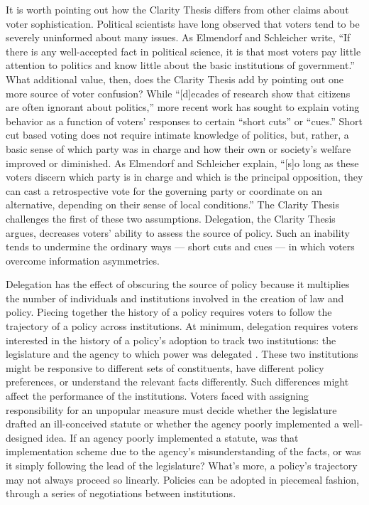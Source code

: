 \documentclass{article}
\begin{document}
It is worth pointing out how the Clarity Thesis differs from other claims about voter sophistication. Political scientists have long observed that voters tend to be severely uninformed about many issues. As Elmendorf and Schleicher write, ``If there is any well-accepted fact in political science, it is that most voters pay little attention to politics and know little about the basic institutions of government.''\citep[p. 1850-51]{Elmendorf2012} What additional value, then, does the Clarity Thesis add by pointing out one more source of voter confusion? While ``[d]ecades of research show that citizens are often ignorant about politics,'' more recent work has sought to explain voting behavior as a function of voters' responses to certain ``short cuts'' or ``cues.''\cite[p. 3]{James2010} Short cut based voting does not require intimate knowledge of politics, but, rather, a basic sense of which party was in charge and how their own or society's welfare improved or diminished.\citep{Lenz2012b} As Elmendorf and Schleicher explain, ``[s]o long as these voters discern which party is in charge and which is the principal opposition, they can cast a retrospective vote for the governing party or coordinate on an alternative, depending on their sense of local conditions.''\citep[p. 1853]{Elmendorf2012} The Clarity Thesis challenges the first of these two assumptions. Delegation, the Clarity Thesis argues, decreases voters' ability to assess the source of policy. Such an inability tends to undermine the ordinary ways --- short cuts and cues --- in which voters overcome information asymmetries.

Delegation has the effect of obscuring the source of policy because it multiplies the number of individuals and institutions involved in the creation of law and policy. \citep{Gailmard2012} Piecing together the history of a policy requires voters to follow the trajectory of a policy across institutions. At minimum, delegation requires voters interested in the history of a policy's adoption to track two institutions: the legislature and the agency to which power was delegated \citep{Gersen2010b}. These two institutions might be responsive to different sets of constituents, have different policy preferences, or understand the relevant facts differently. Such differences might affect the performance of the institutions. Voters faced with assigning responsibility for an unpopular measure must decide whether the legislature drafted an ill-conceived statute or whether the agency poorly implemented a well-designed idea. If an agency poorly implemented a statute, was that implementation scheme due to the agency's misunderstanding of the facts, or was it simply following the lead of the legislature? What's more, a policy's trajectory may not always proceed so linearly. Policies can be adopted in piecemeal fashion, through a series of negotiations between institutions.
\end{document}
